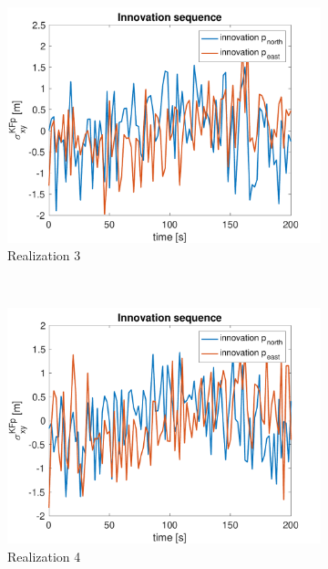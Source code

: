 \documentclass{article}
\begin{document}
\begin{figure}[H]
\begin{subfigure}[t]{0.49\textwidth}
        \includegraphics[width=\textwidth]{3_innovation}
        \caption{Realization 3}
    \end{subfigure}
    ~
    \begin{subfigure}[t]{0.49\textwidth}
        \centering
        \includegraphics[width=\textwidth]{4_innovation}
        \caption{Realization 4}
    \end{subfigure}
    ~
    \begin{subfigure}[t]{0.49\textwidth}
        \centering

\end{subfigure}
\end{figure}
\end{document}

